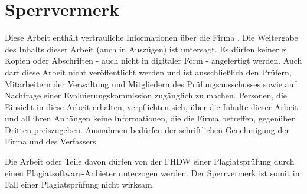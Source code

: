 \section*{Sperrvermerk}

Diese Arbeit enthält vertrauliche Informationen über die Firma \kooperationsunternehmen. Die Weitergabe des Inhalts dieser Arbeit (auch in Auszügen) ist untersagt. Es dürfen keinerlei Kopien oder Abschriften - auch nicht in digitaler Form - angefertigt werden. Auch darf diese Arbeit nicht veröffentlicht werden und ist ausschließlich den Prüfern, Mitarbeitern der Verwaltung und Mitgliedern des Prüfungsausschusses sowie auf Nachfrage einer Evaluierungskommission zugänglich zu machen. Personen, die Einsicht in diese Arbeit erhalten, verpflichten sich, über die Inhalte dieser Arbeit und all ihren Anhängen keine Informationen, die die Firma \kooperationsunternehmen{} betreffen, gegenüber Dritten preiszugeben. Ausnahmen bedürfen der schriftlichen Genehmigung der Firma \kooperationsunternehmen{} und des Verfassers.


Die Arbeit oder Teile davon dürfen von der FHDW einer Plagiatsprüfung durch einen Plagiatsoftware-Anbieter unterzogen werden. Der Sperrvermerk ist somit im Fall einer Plagiatsprüfung nicht wirksam.
\newpage

\fancyhead[R]{\leftmark}
